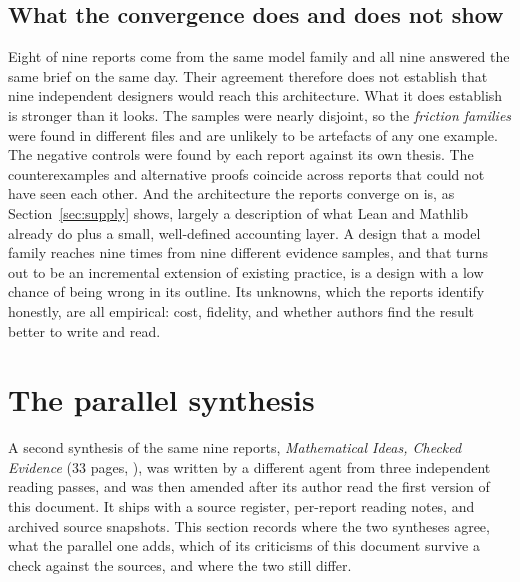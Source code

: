 \documentclass[11pt,a4paper]{article}
\newcommand{\code}[1]{\texttt{\detokenize{#1}}}
\theoremstyle{definition}
\begin{document}
\subsection{What the convergence does and does not show}
\label{sec:convergence-meaning}
Eight of nine reports come from the same model family and all nine answered the same brief on the same day. Their agreement therefore does not establish that nine independent designers would reach this architecture. What it does establish is stronger than it looks. The samples were nearly disjoint, so the \emph{friction families} were found in different files and are unlikely to be artefacts of any one example. The negative controls were found by each report against its own thesis. The counterexamples and alternative proofs coincide across reports that could not have seen each other. And the architecture the reports converge on is, as Section~\ref{sec:supply} shows, largely a description of what Lean and Mathlib already do plus a small, well-defined accounting layer. A design that a model family reaches nine times from nine different evidence samples, and that turns out to be an incremental extension of existing practice, is a design with a low chance of being wrong in its outline. Its unknowns, which the reports identify honestly, are all empirical: cost, fidelity, and whether authors find the result better to write and read.

\section{The parallel synthesis}
\label{sec:parallel}
A second synthesis of the same nine reports, \emph{Mathematical Ideas, Checked Evidence} (33 pages, \code{docs/synthesis/unified-report.tex}), was written by a different agent from three independent reading passes, and was then amended after its author read the first version of this document. It ships with a source register, per-report reading notes, and archived source snapshots. This section records where the two syntheses agree, what the parallel one adds, which of its criticisms of this document survive a check against the sources, and where the two still differ.
\end{document}
